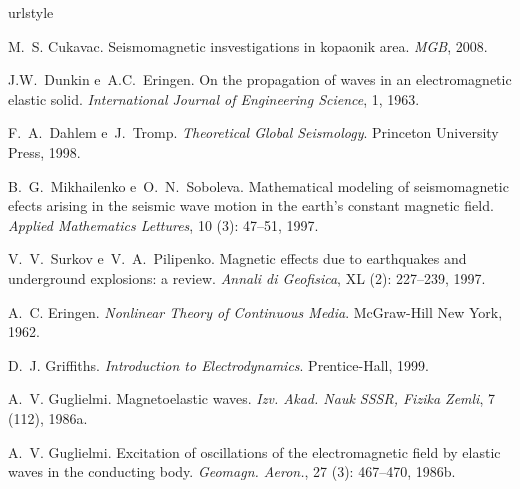 \documentclass[12pt,a4paper,oneside]{abntex2}
\begin{document}






%

\begin{thebibliography}{25}
\providecommand{\natexlab}[1]{#1}
\providecommand{\url}[1]{\texttt{#1}}
\expandafter\ifx\csname urlstyle\endcsname\relax
  \providecommand{\doi}[1]{doi: #1}\else
  \providecommand{\doi}{doi: \begingroup \urlstyle{rm}\Url}\fi


M.~S. Cukavac.
\newblock Seismomagnetic insvestigations in kopaonik area.
\newblock \emph{MGB}, 2008.

J.W.~Dunkin e~A.C.~Eringen.
\newblock On the propagation of waves in an electromagnetic elastic solid.
\newblock \emph{International Journal of Engineering Science}, 1, 1963.


F.~A.~Dahlem e~J.~Tromp.
\newblock \emph{Theoretical Global Seismology}.
\newblock Princeton University Press, 1998.

B.~G.~Mikhailenko e~O.~N.~Soboleva.
\newblock Mathematical modeling of seismomagnetic efects arising in the seismic
  wave motion in the earth's constant magnetic field.
\newblock \emph{Applied Mathematics Lettures}, 10 (3):
  47--51, 1997.

V.~V.~Surkov e~V.~A.~Pilipenko.
\newblock Magnetic effects due to earthquakes and underground explosions: a
  review.
\newblock \emph{Annali di Geofisica}, XL (2): 227--239, 1997.

A.~C. Eringen.
\newblock \emph{Nonlinear Theory of Continuous Media}.
\newblock McGraw-Hill New York, 1962.

D.~J. Griffiths.
\newblock \emph{Introduction to Electrodynamics}.
\newblock Prentice-Hall, 1999.

A.~V. Guglielmi.
\newblock Magnetoelastic waves.
\newblock \emph{Izv. Akad. Nauk SSSR, Fizika Zemli}, 7 (112), 1986a.

A.~V. Guglielmi.
\newblock Excitation of oscillations of the electromagnetic field by elastic
  waves in the conducting body.
\newblock \emph{Geomagn. Aeron.}, 27 (3): 467--470, 1986b.


\end{thebibliography}
\end{document}
